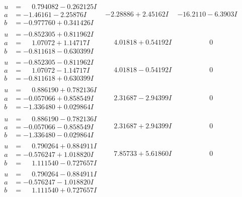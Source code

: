 \documentclass[1p]{elsarticle_modified}
\theoremstyle{definition}
\begin{document}
$$\begin{array}{c|c|c}
\begin{aligned}
u &= \phantom{-}0.794082 - 0.262125 I \\
a &= -1.46161 - 2.25876 I \\
b &= -0.977760 + 0.341426 I\end{aligned}
 & -2.28886 + 2.45162 I & -16.2110 - 6.3903 I \\ \hline\begin{aligned}
u &= -0.852305 + 0.811962 I \\
a &= \phantom{-}1.07072 + 1.14717 I \\
b &= -0.811618 - 0.630399 I\end{aligned}
 & \phantom{-}4.01818 + 0.54192 I & \phantom{-0.000000 } 0 \\ \hline\begin{aligned}
u &= -0.852305 - 0.811962 I \\
a &= \phantom{-}1.07072 - 1.14717 I \\
b &= -0.811618 + 0.630399 I\end{aligned}
 & \phantom{-}4.01818 - 0.54192 I & \phantom{-0.000000 } 0 \\ \hline\begin{aligned}
u &= \phantom{-}0.886190 + 0.782136 I \\
a &= -0.057066 + 0.858549 I \\
b &= -1.336480 + 0.029864 I\end{aligned}
 & \phantom{-}2.31687 - 2.94399 I & \phantom{-0.000000 } 0 \\ \hline\begin{aligned}
u &= \phantom{-}0.886190 - 0.782136 I \\
a &= -0.057066 - 0.858549 I \\
b &= -1.336480 - 0.029864 I\end{aligned}
 & \phantom{-}2.31687 + 2.94399 I & \phantom{-0.000000 } 0 \\ \hline\begin{aligned}
u &= \phantom{-}0.790264 + 0.884911 I \\
a &= -0.576247 + 1.018820 I \\
b &= \phantom{-}1.111540 - 0.727657 I\end{aligned}
 & \phantom{-}7.85733 + 5.61860 I & \phantom{-0.000000 } 0 \\ \hline\begin{aligned}
u &= \phantom{-}0.790264 - 0.884911 I \\
a &= -0.576247 - 1.018820 I \\
b &= \phantom{-}1.111540 + 0.727657 I\end{aligned}

\end{array}$$
\end{document}
